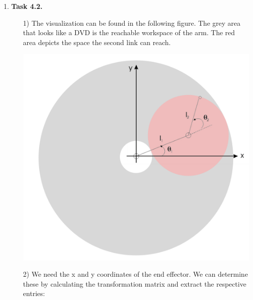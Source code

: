 \documentclass[a4paper,11pt]{article}
\begin{document}
\begin {enumerate}
	\item[\textbf{Task 4.2.}]
		\begin{enumerate}
			\item[1)] The visualization can be found in the following figure. The grey area that looks like a DVD is the reachable workspace of the arm. The red area depicts the space the second link can reach.
			\begin{center}
				\includegraphics[scale=0.2]{4-2-1.png}
			\end{center}

			\item[2)]
				We need the x and y coordinates of the end effector. We can determine these by calculating the transformation matrix and extract the respective entries:


\end{enumerate}
\end{enumerate}
\end{document}
